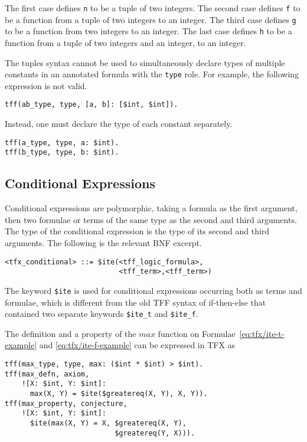 The first case defines \lstinline|n| to be a tuple of two integers.
The second case defines \lstinline|f| to be a function from a tuple of two integers
to an integer.
The third case defines \lstinline|g| to be a function from two integers to an integer.
The last case defines \lstinline|h| to be a function from a tuple of two integers and
an integer, to an integer.

The tuples syntax cannot be used to simultaneously declare types of multiple constants in an annotated formula with the \lstinline'type' role. For example, the following expression is not valid.
\begin{lstlisting}[language=tptp]
tff(ab_type, type, [a, b]: [$int, $int]).
\end{lstlisting}
Instead, one must declare the type of each constant separately.
\begin{lstlisting}[language=tptp]
tff(a_type, type, a: $int).
tff(b_type, type, b: $int).
\end{lstlisting}

\subsection{Conditional Expressions}

Conditional expressions are polymorphic, taking a formula as the first 
argument, then two formulae or terms of the same type as the second and 
third arguments. 
The type of the conditional expression is the type of its second and third 
arguments. 
The following is the relevant BNF excerpt.
\begin{lstlisting}[language=bnf]
<tfx_conditional> ::= $ite(<tff_logic_formula>,
                           <tff_term>,<tff_term>)
\end{lstlisting}

The keyword \lstinline'$ite' is used for conditional expressions occurring both as
terms and formulae, which is different from the old TFF syntax of if-then-else
that contained two separate keywords \lstinline'$ite_t' and \lstinline'$ite_f'.

The definition and a property of the $\mathit{max}$ function on Formulae~\ref{eq:tfx/ite-t-example} and \ref{eq:tfx/ite-f-example} can be expressed in
TFX as
\begin{lstlisting}[language=tptp]
tff(max_type, type, max: ($int * $int) > $int).
tff(max_defn, axiom,
    ![X: $int, Y: $int]:
      max(X, Y) = $ite($greatereq(X, Y), X, Y)).
tff(max_property, conjecture,
    ![X: $int, Y: $int]: 
      $ite(max(X, Y) = X, $greatereq(X, Y),
                          $greatereq(Y, X))).
\end{lstlisting}

